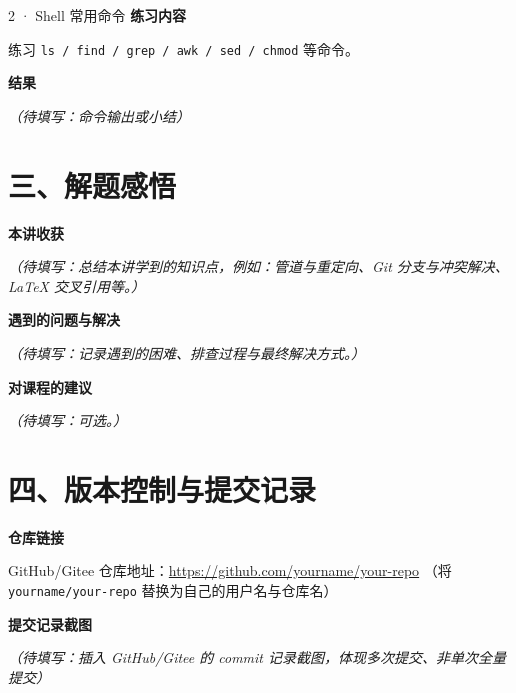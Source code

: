 \documentclass[UTF8, zihao=-4]{ctexart}
\newcommand{\contenthead}[1]{%
  \medskip\noindent\textcolor{cprimary}{\bfseries #1}\par\smallskip
}
\newcommand{\gitlink}[1]{\url{#1}}
\newcommand{\todo}[1]{\textcolor{caccent}{\emph{（待填写：#1）}}}
\begin{document}
\begin{exercise}{2 · Shell 常用命令}
  \contenthead{练习内容}
  练习 \texttt{ls / find / grep / awk / sed / chmod} 等命令。

  \contenthead{结果}
  \todo{命令输出或小结}
\end{exercise}


\section*{三、解题感悟}

\contenthead{本讲收获}
\todo{总结本讲学到的知识点，例如：管道与重定向、Git 分支与冲突解决、
LaTeX 交叉引用等。}

\contenthead{遇到的问题与解决}
\todo{记录遇到的困难、排查过程与最终解决方式。}

\contenthead{对课程的建议}
\todo{可选。}

\section*{四、版本控制与提交记录}

\contenthead{仓库链接}
GitHub/Gitee 仓库地址：\gitlink{https://github.com/yourname/your-repo}
（将 \texttt{yourname/your-repo} 替换为自己的用户名与仓库名）

\contenthead{提交记录截图}
\todo{插入 GitHub/Gitee 的 commit 记录截图，体现多次提交、非单次全量提交}
\begin{center}
\end{center}
\end{document}
